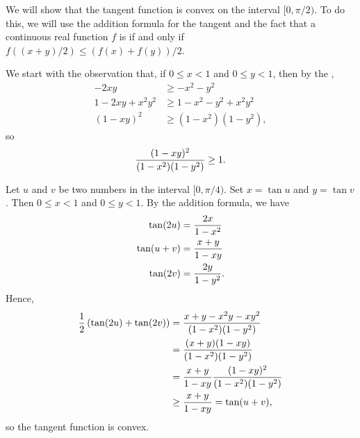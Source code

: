 \documentclass[12pt]{article}
\begin{document}
We will show that the tangent function is convex on the interval $[0, \pi/2)$.
To do this, we will use the addition formula for the tangent and the fact that
a continuous real function $f$ is  if and only if $f((x + y)/2) \le (f(x) + f(y))/2$.

We start with the observation that, if $0 \le x < 1$ and $0 \le y < 1$, then by the 
, 
\begin{align*}
-2 x y &\ge - x^2 - y^2 \\
1 - 2 x y + x^2 y^2 &\ge 1 - x^2 - y^2 + x^2 y^2 \\
(1 - xy)^2 &\ge (1 - x^2) (1 - y^2),
\end{align*}
so
\[
{(1 - xy)^2 \over (1 - x^2) (1 - y^2)} \ge 1.
\]

Let $u$ and $v$ be two numbers in the interval $[0,\pi/4)$.  Set $x = \tan u$ and $y = \tan v$.
Then $0 \le x < 1$ and $0 \le y < 1.$  By the addition formula, we have
\begin{align*}
\tan (2u) &= {2x \over 1 - x^2} \\
\tan (u+v) &= {x + y \over 1 - x y} \\
\tan (2v) &= {2y \over 1 - y^2} .
\end{align*}
Hence,
\begin{align*}
{1 \over 2} \left( \tan (2u) + \tan (2v) \right) &= 
{x + y - x^2 y - xy^2 \over (1 - x^2) (1 - y^2)} \\ &=
{(x + y) (1 - x y) \over (1 - x^2) (1 - y^2)} \\ &=
{x + y \over 1 - x y}
{(1 - xy)^2 \over (1 - x^2) (1 - y^2)} \\ &\ge
{x + y \over 1 - x y} = \tan (u + v),
\end{align*}
so the tangent function is convex.
\end{document}
